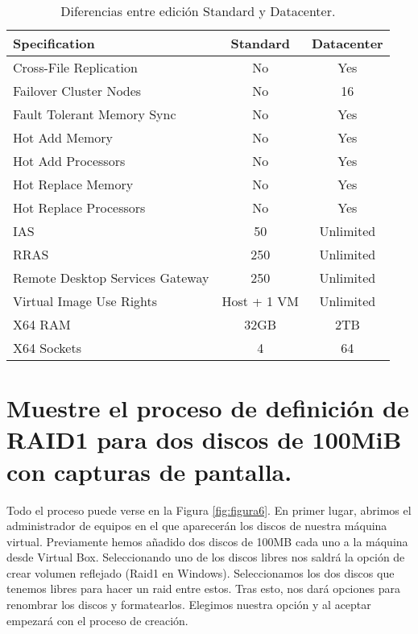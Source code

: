 \begin{table}[H]
\centering
\begin{tabular}{|l|c|c|}
\hline
\textbf{ Specification} & \textbf{Standard} & \textbf{Datacenter} \\
\hline
Cross-File Replication & No & Yes \\
Failover Cluster Nodes & No & 16 \\
Fault Tolerant Memory Sync & No & Yes \\
Hot Add Memory & No & Yes \\
Hot Add Processors & No & Yes \\
Hot Replace Memory & No & Yes \\
Hot Replace Processors & No & Yes \\
IAS & 50 & Unlimited \\
RRAS & 250 & Unlimited \\
Remote Desktop Services Gateway & 250 & Unlimited \\
Virtual Image Use Rights & Host + 1 VM & Unlimited \\
X64 RAM & 32GB & 2TB \\
X64 Sockets & 4 & 64 \\
\hline
\end{tabular}  
\caption{Diferencias entre edición Standard y Datacenter.} \label{tab:StdvsDatacenter}
\end{table}





\section{Muestre el proceso de definición de RAID1 para dos discos de 100MiB con capturas de pantalla.}

Todo el proceso puede verse en la Figura \ref{fig:figura6}. En primer lugar, abrimos el administrador de equipos en el que aparecerán los discos de nuestra máquina virtual. 
Previamente hemos añadido dos discos de 100MB cada uno a la máquina desde Virtual Box. Seleccionando uno de los discos libres nos saldrá la opción de crear volumen 
reflejado (Raid1 en Windows). Seleccionamos los dos discos que tenemos libres para hacer un raid entre estos. Tras esto, nos dará opciones para renombrar los discos y 
formatearlos. Elegimos nuestra opción y al aceptar empezará con el proceso de creación.

